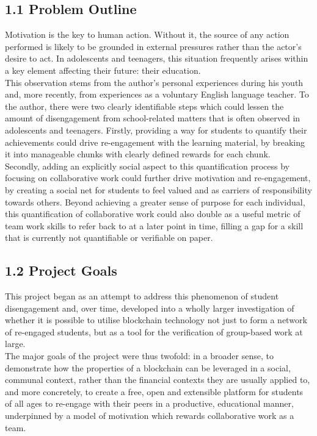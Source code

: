 \documentclass[12pt]{report}
\begin{document}
\subsection{1.1 Problem Outline}\label{problem-outline}

Motivation is the key to human action. Without it, the source of any
action performed is likely to be grounded in external pressures rather
than the actor's desire to act. In adolescents and teenagers, this
situation frequently arises within a key element affecting their future:
their education.\\
This observation stems from the author's personal experiences during his
youth and, more recently, from experiences as a voluntary English
language teacher. To the author, there were two clearly identifiable
steps which could lessen the amount of disengagement from school-related
matters that is often observed in adolescents and teenagers. Firstly,
providing a way for students to quantify their achievements could drive
re-engagement with the learning material, by breaking it into manageable
chunks with clearly defined rewards for each chunk.\\
Secondly, adding an explicitly social aspect to this quantification
process by focusing on collaborative work could further drive motivation
and re-engagement, by creating a social net for students to feel valued
and as carriers of responsibility towards others. Beyond achieving a
greater sense of purpose for each individual, this quantification of
collaborative work could also double as a useful metric of team work
skills to refer back to at a later point in time, filling a gap for a
skill that is currently not quantifiable or verifiable on paper.

\subsection{1.2 Project Goals}\label{project-goals}

This project began as an attempt to address this phenomenon of student
disengagement and, over time, developed into a wholly larger
investigation of whether it is possible to utilise blockchain technology
not just to form a network of re-engaged students, but as a tool for the
verification of group-based work at large.\\
The major goals of the project were thus twofold: in a broader sense, to
demonstrate how the properties of a blockchain can be leveraged in a
social, communal context, rather than the financial contexts they are
usually applied to, and more concretely, to create a free, open and
extensible platform for students of all ages to re-engage with their
peers in a productive, educational manner, underpinned by a model of
motivation which rewards collaborative work as a team.
\end{document}
